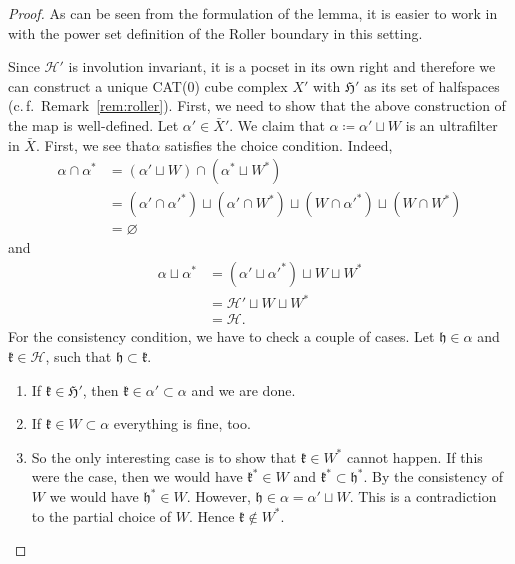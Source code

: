 \begin{proof}
  As can be seen from the formulation of the lemma, it is easier to work in with the power set definition of the Roller boundary in this setting.

  Since \(\mathcal{H}'\) is involution invariant, it is a pocset in its own right and therefore we can construct a unique CAT(0) cube complex \(X'\) with \(\mathfrak{H}'\) as its set of halfspaces (c.\,f.\ Remark~\ref{rem:roller}). First, we need to show that the above construction of the map is well-defined. Let \(\alpha' \in \bar X'\). We claim that \(\alpha \coloneqq \alpha' \sqcup W\) is an ultrafilter in \(\bar X\). First, we see that\(\alpha\) satisfies the choice condition. Indeed,
  \begin{align*}
    \alpha \cap \alpha^\ast
    & = (\alpha' \sqcup W) \cap (\alpha^\ast \sqcup W^\ast)\\
    & = (\alpha' \cap \alpha'^\ast) \sqcup (\alpha' \cap W^\ast) \sqcup (W \cap \alpha'^\ast) \sqcup (W \cap W^\ast)\\
    & = \varnothing
  \end{align*}
  and
  \begin{align*}
    \alpha \sqcup \alpha^\ast
    & = (\alpha' \sqcup \alpha'^\ast) \sqcup W \sqcup W^\ast\\
    & = \mathcal{H}' \sqcup W \sqcup W^\ast\\
    & = \mathcal{H}.
  \end{align*}
  For the consistency condition, we have to check a couple of cases. Let \(\mathfrak{h} \in \alpha\) and \(\mathfrak{k} \in \mathcal{H}\), such that \(\mathfrak{h} \subset \mathfrak{k}\). 
  \begin{enumerate}
  \item If \(\mathfrak{k} \in \mathfrak{H}'\), then \(\mathfrak{k} \in \alpha' \subset \alpha\) and we are done.
  \item If \(\mathfrak{k} \in W \subset \alpha\) everything is fine, too. 
  \item So the only interesting case is to show that \(\mathfrak{k} \in W^\ast\) cannot happen. If this were the case, then we would have \(\mathfrak{k}^\ast \in W\) and \(\mathfrak{k}^\ast \subset \mathfrak{h}^\ast\). By the consistency of \(W\) we would have \(\mathfrak{h}^\ast \in W\). However, \(\mathfrak{h} \in \alpha = \alpha' \sqcup W\). This is a contradiction to the partial choice of \(W\). Hence \(\mathfrak{k} \notin W^\ast\).
  \end{enumerate}


\end{proof}

